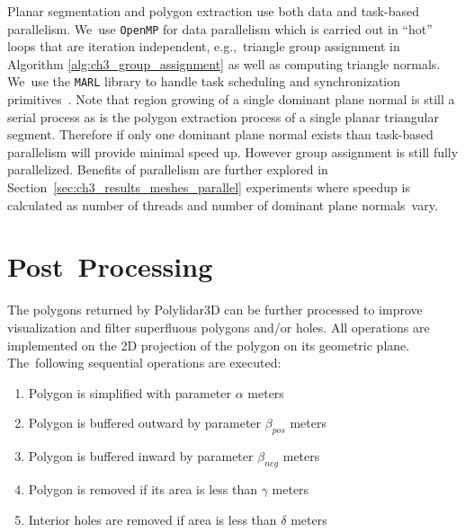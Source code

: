 Planar segmentation and polygon extraction use both data and task-based parallelism. We~use \texttt{OpenMP} for data parallelism which is carried out in ``hot'' loops that are iteration independent, e.g.,~triangle group assignment in Algorithm \ref{alg:ch3_group_assignment} as well as computing triangle normals. We~use the \texttt{MARL} library to handle task scheduling and synchronization primitives~\cite{marl}. Note that region growing of a single dominant plane normal is still a serial process as is the polygon extraction process of a single planar triangular segment. Therefore if only one dominant plane normal exists than task-based parallelism will provide minimal speed up. However group assignment  is still fully parallelized. Benefits of parallelism are further explored in Section~\ref{sec:ch3_results_meshes_parallel} experiments where speedup is calculated as number of threads and number of dominant plane normals~vary.

\section{Post~Processing}\label{sec:ch3_methods_polylidar_polygon_filtering}

The polygons returned by Polylidar3D can be further processed to improve visualization and filter superfluous polygons and/or holes. All operations are implemented on the 2D projection of the polygon on its geometric plane. The~following sequential operations are executed:

\begin{enumerate}
    \item Polygon is simplified with parameter $\alpha$ meters %
    \item Polygon is buffered outward by parameter $\beta_{pos}$ meters %
    \item Polygon is buffered inward by  parameter $\beta_{neg}$ meters %
    \item Polygon is removed if its area is less than $\gamma$ meters %
    \item Interior holes are removed if area is less than $\delta$ meters %
\end{enumerate}


